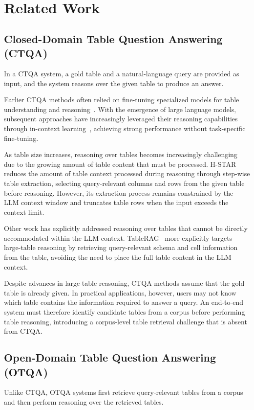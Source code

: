
\chapter{Related Work}

\section{Closed-Domain Table Question Answering (CTQA)}
In a CTQA system, a gold table and a natural-language query are provided as input, and the system reasons over the given table to produce an answer.

Earlier CTQA methods often relied on fine-tuning specialized models for table understanding and reasoning~\cite{tapas,tapex}. With the emergence of large language models, subsequent approaches have increasingly leveraged their reasoning capabilities through in-context learning~\cite{reactable,chainoftable}, achieving strong performance without task-specific fine-tuning.

As table size increases, reasoning over tables becomes increasingly challenging due to the growing amount of table content that must be processed.
H-STAR~\cite{hstar} reduces the amount of table context processed during reasoning through step-wise table extraction, selecting query-relevant columns and rows from the given table before reasoning.
However, its extraction process remains constrained by the LLM context window and truncates table rows when the input exceeds the context limit.

Other work has explicitly addressed reasoning over tables that cannot be directly accommodated within the LLM context.
TableRAG~\cite{tablerag} more explicitly targets large-table reasoning by retrieving query-relevant schema and cell information from the table, avoiding the need to place the full table content in the LLM context.

Despite advances in large-table reasoning, CTQA methods assume that the gold table is already given.
In practical applications, however, users may not know which table contains the information required to answer a query.
An end-to-end system must therefore identify candidate tables from a corpus before performing table reasoning, introducing a corpus-level table retrieval challenge that is absent from CTQA.



\section{Open-Domain Table Question Answering (OTQA)}
Unlike CTQA, OTQA systems first retrieve query-relevant tables from a corpus and then perform reasoning over the retrieved tables.

